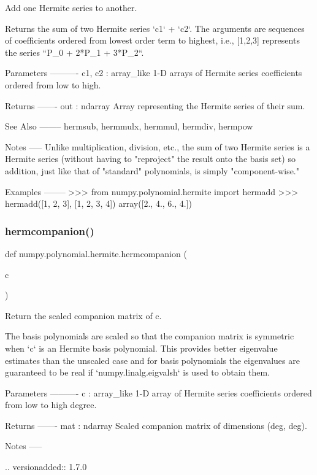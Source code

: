 \begin{DoxyVerb}Add one Hermite series to another.

Returns the sum of two Hermite series `c1` + `c2`.  The arguments
are sequences of coefficients ordered from lowest order term to
highest, i.e., [1,2,3] represents the series ``P_0 + 2*P_1 + 3*P_2``.

Parameters
----------
c1, c2 : array_like
    1-D arrays of Hermite series coefficients ordered from low to
    high.

Returns
-------
out : ndarray
    Array representing the Hermite series of their sum.

See Also
--------
hermsub, hermmulx, hermmul, hermdiv, hermpow

Notes
-----
Unlike multiplication, division, etc., the sum of two Hermite series
is a Hermite series (without having to "reproject" the result onto
the basis set) so addition, just like that of "standard" polynomials,
is simply "component-wise."

Examples
--------
>>> from numpy.polynomial.hermite import hermadd
>>> hermadd([1, 2, 3], [1, 2, 3, 4])
array([2., 4., 6., 4.])\end{DoxyVerb}
 \mbox{\label{namespacenumpy_1_1polynomial_1_1hermite_a1fd820cfc82c6018045ac52f25a8ef3e}} 
\subsubsection{\texorpdfstring{hermcompanion()}{hermcompanion()}}
{\footnotesize\ttfamily def numpy.\+polynomial.\+hermite.\+hermcompanion (\begin{DoxyParamCaption}\item[{}]{c }\end{DoxyParamCaption})}

\begin{DoxyVerb}Return the scaled companion matrix of c.

The basis polynomials are scaled so that the companion matrix is
symmetric when `c` is an Hermite basis polynomial. This provides
better eigenvalue estimates than the unscaled case and for basis
polynomials the eigenvalues are guaranteed to be real if
`numpy.linalg.eigvalsh` is used to obtain them.

Parameters
----------
c : array_like
    1-D array of Hermite series coefficients ordered from low to high
    degree.

Returns
-------
mat : ndarray
    Scaled companion matrix of dimensions (deg, deg).

Notes
-----

.. versionadded:: 1.7.0\end{DoxyVerb}
 \mbox{\label{namespacenumpy_1_1polynomial_1_1hermite_a80f345ac93457086ee61c08d4f6a9bc8}} 
